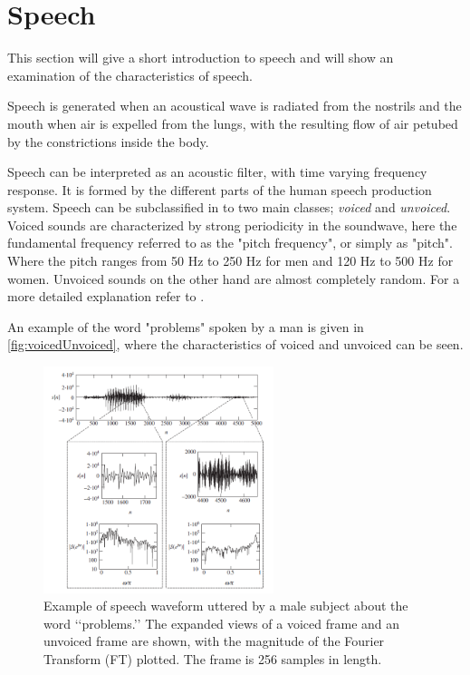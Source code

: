 \section{Speech} \label{sec:Speech}
This section will give a short introduction to speech and will show an examination of the characteristics of speech.

Speech is generated when an acoustical wave is radiated from the nostrils and the mouth when air is expelled from the lungs, with the resulting flow of air petubed by the constrictions inside the body.

Speech can be interpreted as an acoustic filter, with time varying frequency response. It is formed by the different parts of the human speech production system. Speech can be subclassified in to two main classes; \textit{voiced} and \textit{unvoiced}. Voiced sounds are characterized by strong periodicity in the soundwave, here the fundamental frequency referred  to as the "pitch frequency", or simply as "pitch". Where the pitch ranges from 50 Hz to 250 Hz for men and 120 Hz to 500 Hz for women. Unvoiced sounds on the other hand are almost completely random. For a more detailed explanation refer to . 

An example of the word "problems" spoken by a man is given in \autoref{fig:voicedUnvoiced}, where the characteristics of voiced and unvoiced can be seen. 

\begin{figure}[H]
	\centering
	\includegraphics[width=0.6\textwidth]{figures/Speech/VoicedvsUnvoiced}
	\caption{Example of speech waveform uttered by a male subject about the word ‘‘problems.’’ The expanded views of a voiced frame and an unvoiced frame are shown, with the magnitude of the Fourier Transform (FT) plotted. The frame is 256 samples in length.}
	\label{fig:voicedUnvoiced}
\end{figure}   

